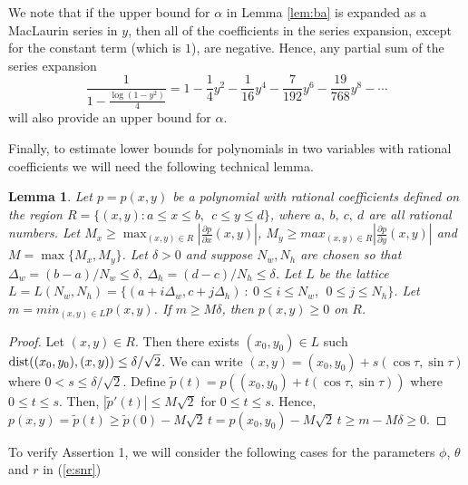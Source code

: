 \documentclass[12pt]{icgft}
\newtheorem{lemma}[theorem]{Lemma}
\theoremstyle{definition}
\numberwithin{equation}{section}
\begin{document}
We note that if the upper bound for $\alpha$ in Lemma \ref{lem:ba} is expanded as a MacLaurin
series in $y$, then all of the coefficients in the series expansion, except for the constant term (which is $1$), are negative.  Hence, any partial sum of the series expansion
\begin{equation} \label{e:series}
\frac{1}{1- \frac{\log(1-y^2)}{4} } = 1 - \frac{1}{4}y^2 - \frac{1}{16}y^4 - \frac{7}{192}y^6  - \frac{19}{768}y^8 - \cdots
\end{equation}
\noindent will also provide an upper bound for $\alpha$.

\vspace{0.1in}

Finally, to estimate lower bounds for polynomials in two variables with rational coefficients we will need the following technical lemma.

\begin{lemma}  \label{lem:poly}
Let $p = p(x,y)$ be a polynomial with rational coefficients defined on the region $R = \{ (x,y) : a \le x \le b,\ \ c \le y \le d \}$, where $a,\ b,\ c,\ d$ are all rational numbers. Let $M_x \ge \max_{(x,y) \in R} \left | \frac{\partial p}{\partial x}(x,y)\right |$, $M_y \ge max_{(x,y) \in R} \left| \frac{\partial p}{\partial y}(x,y)\right |$
and $M = \max \{M_x,M_y\}$.  Let $\delta > 0 $ and suppose $N_w, N_h$ are chosen so that
$\Delta_w = (b-a)/N_w \le \delta ,\ \Delta_h = (d-c)/N_h \le \delta$.  Let $L$ be the lattice
$L = L(N_w,N_h) = \{ (a + i\Delta_w,c + j\Delta_h)\  :\  0 \le i \le N_w,\ \   0 \le j \le N_h\}$.
Let $m = min_{(x,y) \in L} p(x,y)$.  If $m \ge M\delta$, then $p(x,y) \ge 0$ on $R$.
\end{lemma}
\begin{proof}
Let $(x,y) \in R$.  Then there exists $(x_0,y_0) \in L$ such ${\rm dist}( (x_0,y_0),(x,y) )
\le \delta/\sqrt{2}$.  We can write $(x,y) = (x_0,y_0) + s (\cos \tau , \sin \tau )$ where
$0 < s \le \delta/\sqrt{2}$.  Define ${\tilde p}(t) = p((x_0,y_0) + t (\cos \tau , \sin \tau ))$
where $0 \le t \le s$.  Then, $\left | {\tilde p}'(t) \right | \le M\sqrt{2}$ for $0 \le t \le s$.
Hence, $p(x,y) = {\tilde p}(t) \ge {\tilde p}(0) - M \sqrt{2}\, t = p(x_0,y_0) - M \sqrt{2}\, t \ge m - M \delta \ge 0$.
\end{proof}

\vspace{0.1in}

To verify Assertion 1, we will consider the following cases for the parameters $\phi$, $\theta$ and $r$ in (\ref{e:snr})
\end{document}
